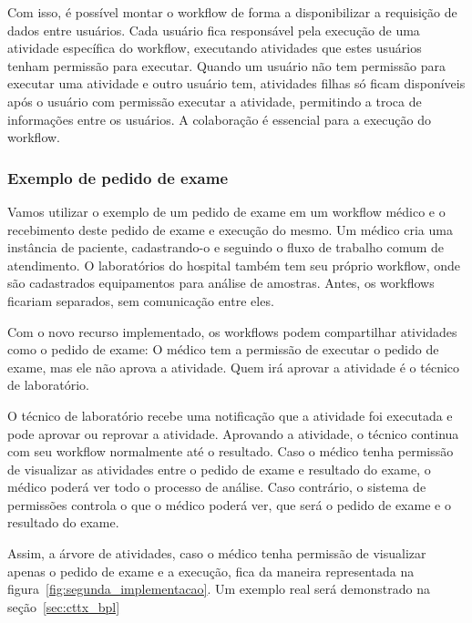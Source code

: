 Com isso, é possível montar o workflow de forma a disponibilizar a requisição de dados entre usuários. Cada usuário fica responsável pela execução de uma atividade específica do workflow, executando atividades que estes usuários tenham permissão para executar. Quando um usuário não tem permissão para executar uma atividade e outro usuário tem, atividades filhas só ficam disponíveis após o usuário com permissão executar a atividade, permitindo a troca de informações entre os usuários. A colaboração é essencial para a execução do workflow.

\subsubsection{Exemplo de pedido de exame}

Vamos utilizar o exemplo de um pedido de exame em um workflow médico e o recebimento deste pedido de exame e execução do mesmo.
Um médico cria uma instância de paciente, cadastrando-o e seguindo o fluxo de trabalho comum de atendimento.
O laboratórios do hospital também tem seu próprio workflow, onde são cadastrados equipamentos para análise de amostras.
Antes, os workflows ficariam separados, sem comunicação entre eles.

Com o novo recurso implementado, os workflows podem compartilhar atividades como o pedido de exame: O médico tem a permissão de executar o pedido de exame, mas ele não aprova a atividade. Quem irá aprovar a atividade é o técnico de laboratório.

O técnico de laboratório recebe uma notificação que a atividade foi executada e pode aprovar ou reprovar a atividade.
Aprovando a atividade, o técnico continua com seu workflow normalmente até o resultado.
Caso o médico tenha permissão de visualizar as atividades entre o pedido de exame e resultado do exame, o médico poderá ver todo o processo de análise.
Caso contrário, o sistema de permissões controla o que o médico poderá ver, que será o pedido de exame e o resultado do exame.

Assim, a árvore de atividades, caso o médico tenha permissão de visualizar apenas o pedido de exame e a execução, fica da maneira representada na figura~\ref{fig:segunda_implementacao}. Um exemplo real será demonstrado na seção~\ref{sec:cttx_bpl}


